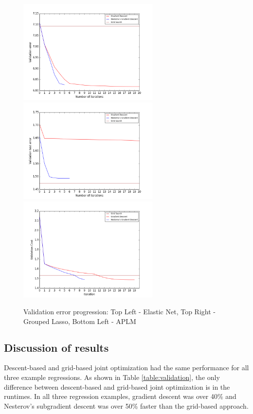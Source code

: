 \documentclass[10pt,letterpaper]{article}
\begin{document}
\begin{figure} 
\includegraphics[width=70mm]{elasticnet_costpath_80_250_15.png}
\includegraphics[width=70mm]{grouped_lasso_60_1500_3_150.png}
\includegraphics[width=70mm]{smooth_linear_simple_cost_path_1_100_20_6.png}
\caption{Validation error progression: Top Left - Elastic Net, Top Right - Grouped Lasso, Bottom Left - APLM}
\label{figure:costpath}
\end{figure}

\subsection{Discussion of results}

Descent-based and grid-based joint optimization had the same performance for all three example regressions. As shown in Table \ref{table:validation}, the only difference between descent-based and grid-based joint optimization is in the runtimes. In all three regression examples, gradient descent was over 40\% and Nesterov's subgradient descent was over 50\% faster than the grid-based approach.
\end{document}
